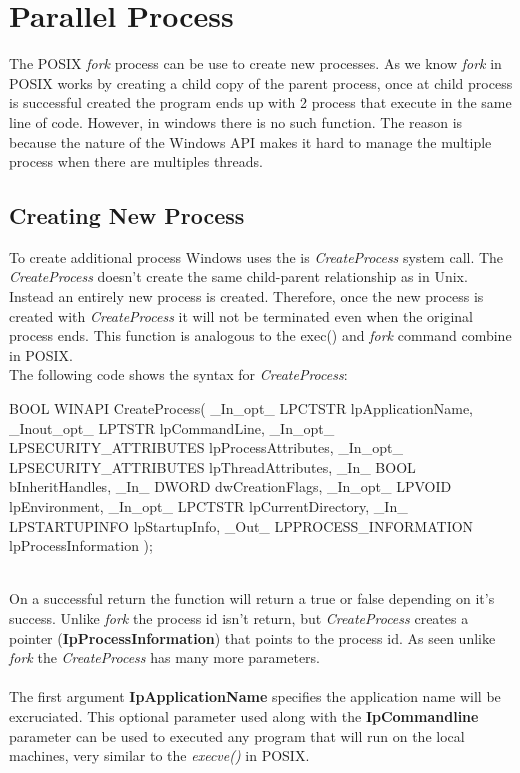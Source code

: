 \documentclass[a4paper]{article}
\begin{document}
\section{Parallel Process }
The POSIX \textit{fork} process can be use to create new processes. As we know \textit{fork} in POSIX works by creating a child copy of the parent process, once at child process is successful created the program ends up with 2 process that execute in the same line of code. However, in windows there is no such function. The reason is because the nature of the Windows API makes it hard to manage the multiple process when there are multiples threads. 
\subsection{ Creating New Process}
To create additional process Windows uses the is \textit{CreateProcess} system call. The  \textit{CreateProcess} doesn’t create the same child-parent relationship as in Unix. Instead an entirely new process is created. Therefore, once the new process is created with \textit{CreateProcess} it will not be terminated even when the original process ends. This function is analogous to the exec() and \textit{fork} command combine in POSIX.\\
\newpage
 The following code shows the syntax for \textit{CreateProcess}:\\
\begin{code}

BOOL WINAPI CreateProcess(
 	_In_opt_     LPCTSTR lpApplicationName,
  	_Inout_opt_  LPTSTR lpCommandLine,
  	_In_opt_     LPSECURITY_ATTRIBUTES lpProcessAttributes,
  	_In_opt_     LPSECURITY_ATTRIBUTES lpThreadAttributes,
  	_In_         BOOL bInheritHandles,
  	_In_         DWORD dwCreationFlags,
  	_In_opt_     LPVOID lpEnvironment,
  	_In_opt_     LPCTSTR lpCurrentDirectory,
  	_In_         LPSTARTUPINFO lpStartupInfo,
  	_Out_        LPPROCESS_INFORMATION lpProcessInformation
);

\end{code}\\
On a successful return the function will return a true or false depending on it’s success. Unlike \textit{fork} the process id isn’t return, but \textit{CreateProcess} creates a pointer (\textbf{IpProcessInformation}) that points to the process id. As seen unlike  \textit{fork} the \textit{CreateProcess} has many more parameters. \\
\\
The first argument \textbf{IpApplicationName} specifies the application name will be excruciated. This optional parameter used along with the \textbf{IpCommandline} parameter can be used to executed any program that will run on the local machines, very similar to the \textit{execve()} in POSIX. 
\end{document}
